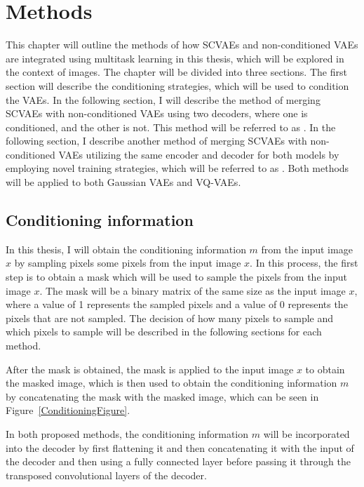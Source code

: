 \chapter{Methods}

This chapter will outline the methods of how SCVAEs and non-conditioned VAEs are
integrated using multitask learning in this thesis, which will be explored in
the context of images. The chapter will be divided into three sections. The first
section will describe the conditioning strategies, which will be used to
condition the VAEs. In the following section, I will describe the method of
merging SCVAEs with non-conditioned VAEs using two decoders, where one is
conditioned, and the other is not. This method will be referred to as
. In the following section, I describe another method of merging
SCVAEs with non-conditioned VAEs utilizing the same encoder and decoder for
both models by employing novel training strategies, which will be referred to
as . Both methods will be applied to both Gaussian VAEs and VQ-VAEs.

\section{Conditioning information}

In this thesis, I will obtain the conditioning information $m$ from the input
image $x$ by sampling pixels some pixels from the input image $x$. In this
process, the first step is to obtain a mask which will be used to sample
the pixels from the input image $x$. The mask will be a binary matrix of the
same size as the input image $x$, where a value of 1 represents the sampled
pixels and a value of 0 represents the pixels that are not sampled. The
decision of how many pixels to sample and which pixels to sample will be described
in the following sections for each method.

After the mask is obtained, the mask is applied to the input image $x$ to
obtain the masked image, which is then used to obtain the conditioning
information $m$ by concatenating the mask with the masked image, which can be
seen in Figure~\ref{ConditioningFigure}.

In both proposed methods, the conditioning information $m$ will be incorporated
into the decoder by first flattening it and then concatenating it with the input of the decoder and then using a fully connected layer before passing it through the transposed convolutional layers of the decoder.

